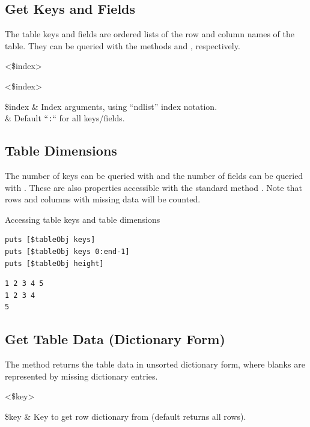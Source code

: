 \subsection{Get Keys and Fields}
The table keys and fields are ordered lists of the row and column names of the table.
They can be queried with the methods  and , respectively. 
\begin{syntax}
 <\$index>
\end{syntax}
\begin{syntax}
 <\$index>
\end{syntax}
\begin{args}
\$index & Index arguments, using ``ndlist'' index notation. \\
& Default ``\texttt{:}`` for all keys/fields.
\end{args}
\subsection{Table Dimensions}
The number of keys can be queried with  and the number of fields can be queried with . 
These are also properties accessible with the standard method .
Note that rows and columns with missing data will be counted.
\begin{syntax}
\end{syntax}
\begin{syntax}
\end{syntax}

\begin{example}{Accessing table keys and table dimensions}
\begin{lstlisting}
puts [$tableObj keys]
puts [$tableObj keys 0:end-1]
puts [$tableObj height]
\end{lstlisting}
\tcblower
\begin{lstlisting}
1 2 3 4 5
1 2 3 4
5
\end{lstlisting}
\end{example}
\clearpage
\subsection{Get Table Data (Dictionary Form)}
The method  returns the table data in unsorted dictionary form, where blanks are represented by missing dictionary entries. 
\begin{syntax}
 <\$key>
\end{syntax}
\begin{args}
\$key & Key to get row dictionary from (default returns all rows). 
\end{args}

